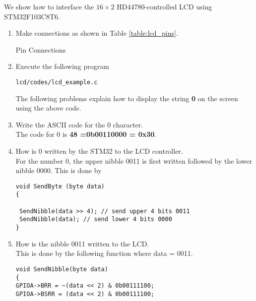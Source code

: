 We show how to interface the $16 \times 2$ HD44780-controlled LCD using STM32F103C8T6.
\begin{enumerate}[label=\arabic*.,ref=\theenumi]
\item Make connections as shown in Table \ref{table:lcd_pins}.
\begin{table}[!h]

\caption{Pin Connections}
\label{table:lcd_pins}
\end{table}
\item Execute the following program
\begin{lstlisting}
lcd/codes/lcd_example.c
\end{lstlisting}
The following problems explain how to display the string \textbf{0} on the screen using
the above code.
\item Write the ASCII code for the 0 character.
\\
\solution The code for 0 is \textbf{48 =0b00110000 = 0x30}.
\\
\item How is 0 written by the STM32 to the LCD controller.
\\
\solution For the number 0, the upper nibble 0011 is first written followed by the lower nibble 0000.
This is done by
\begin{lstlisting}
void SendByte (byte data)
{

 SendNibble(data >> 4); // send upper 4 bits 0011
 SendNibble(data); // send lower 4 bits 0000
}
\end{lstlisting}
\item How is the nibble 0011 written to the LCD.
\\
\solution This is done by the following function where data = 0011.
\begin{lstlisting}
void SendNibble(byte data)
{
GPIOA->BRR = ~(data << 2) & 0b00111100;
GPIOA->BSRR = (data << 2) & 0b00111100;
 

\end{lstlisting}
\end{enumerate}

